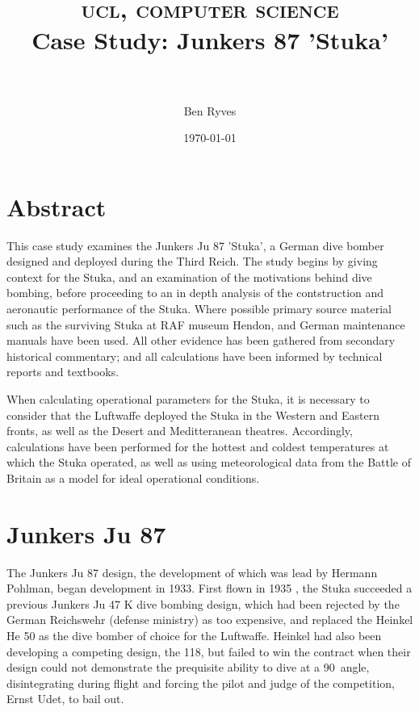 \documentclass[a4paper, fontsize=11pt]{scrartcl} %
\title{
  \normalfont \normalsize
  \textsc{ucl, computer science}
  \horrule{0.5pt} \\[0.4cm]
  \huge{Case Study: Junkers 87 'Stuka'}\\
  \horrule{0.5pt} \\[0.5cm]
}
\author{Ben Ryves}
\date{\normalsize\today}
\begin{document}
\maketitle
\tableofcontents
\section{Abstract}
This case study examines the Junkers Ju 87 'Stuka', a German dive bomber
designed and deployed during the Third Reich. The study begins by giving
context for the Stuka, and an examination of the motivations behind dive
bombing, before proceeding to an in depth analysis of the contstruction
and aeronautic performance of the Stuka. Where possible primary source
material such as the surviving Stuka at RAF museum Hendon, and German
maintenance manuals have been used. All other evidence has been
gathered from secondary historical commentary; and all calculations have
been informed by technical reports and textbooks.

When calculating operational parameters for the Stuka, it is necessary
to consider that the Luftwaffe deployed the Stuka in the Western and
Eastern fronts, as well as the Desert and Meditteranean theatres.
Accordingly, calculations have been performed for the hottest and
coldest temperatures at which the Stuka operated, as well as using
meteorological data from the Battle of Britain as a model for ideal
operational conditions.
\section{Junkers Ju 87}

The Junkers Ju 87 design, the development of
which was lead by Hermann Pohlman, began development in 1933. First flown
in 1935 \autocite[p.~9]{weal97}, the Stuka succeeded a previous
Junkers Ju 47 K dive bombing design, which had been rejected by the
German Reichswehr (defense ministry) as too expensive, and replaced the
Heinkel He 50 as the dive bomber of choice for the Luftwaffe. Heinkel
had also been developing a competing design, the 118, but failed to win the
contract when their design could not demonstrate the prequisite
ability to dive at a 90\textdegree\ angle, disintegrating during flight
\autocite[p.~68-69]{killen67} and forcing the pilot and judge of the
competition, Ernst Udet, to bail out.
\end{document}
